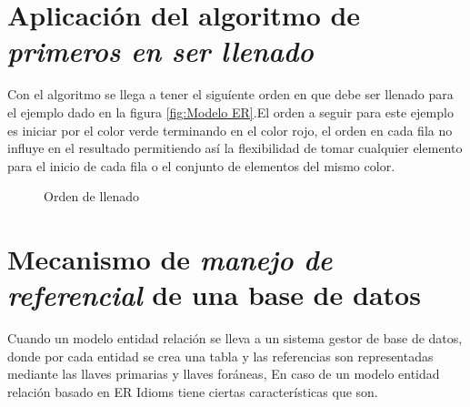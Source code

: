 \section{Aplicaci\'on del algoritmo de \textit{primeros en ser llenado}}
Con el algoritmo se llega a tener el sigu\'iente orden en que debe ser llenado para el ejemplo dado en la figura  \ref{fig:Modelo ER}.El orden a seguir para este ejemplo es iniciar por el color verde terminando en el color rojo, el orden en cada fila no influye en el resultado permitiendo as\'i la flexibilidad de tomar cualquier elemento para el inicio de cada fila o el conjunto de elementos del mismo color.
\begin{figure}[H]
\centering
{}
\caption{Orden de llenado}
\label{fig:Orden de llenado}
\end{figure}
\section{Mecanismo de \textit{manejo de referencial} de una base de datos}
Cuando un modelo entidad relaci\'on se lleva a un sistema gestor de base de datos, donde por cada entidad se crea una tabla y las  referencias son representadas mediante las llaves primarias y llaves for\'aneas, En caso de un modelo entidad relaci\'on basado en ER Idioms tiene ciertas caracter\'isticas que son.
